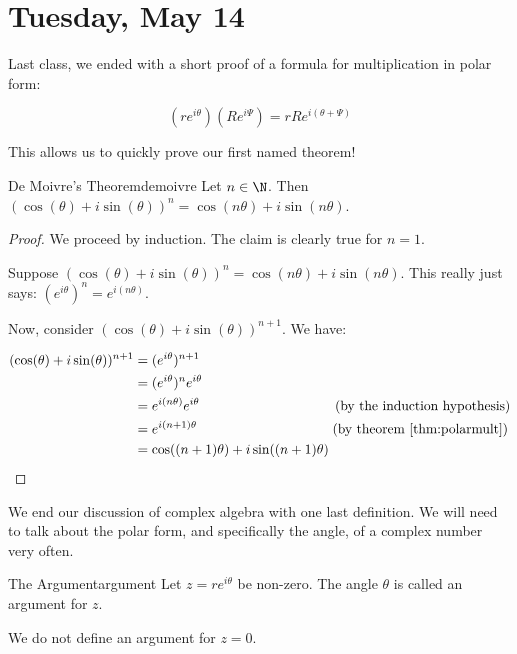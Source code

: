 \section{Tuesday, May 14}


Last class, we ended with a short proof of a formula for multiplication in polar form:

$$(re^{i\theta})(Re^{i\Psi}) = rRe^{i(\theta + \Psi)}$$

This allows us to quickly prove our first named theorem!

\begin{thmbo}{De Moivre's Theorem}{demoivre} 
Let $n\in \N$. Then $(\cos(\theta) + i\sin(\theta))^n = \cos(n\theta) + i\sin(n\theta)$.
\end{thmbo}

\begin{proof} We proceed by induction. The claim is clearly true for $n = 1$.

Suppose $(\cos(\theta) + i\sin(\theta))^n = \cos(n\theta) + i\sin(n\theta)$. This really just says: $(e^{i\theta})^n = e^{i(n\theta)}$.

Now, consider $(\cos(\theta) + i\sin(\theta))^{n+1}$. We have:

\begin{align*} (\cos(\theta) + i\sin(\theta))^{n+1} &= (e^{i\theta})^{n+1}\\
&= (e^{i\theta})^ne^{i\theta}\\
&= e^{i(n\theta)}e^{i\theta} \qquad\qquad\qquad\qquad \qquad   (\text{by the induction hypothesis})\\
&= e^{i(n+1)\theta} \qquad \qquad\qquad \qquad\qquad 	 	 (\text{by theorem \ref{thm:polarmult}})\\
&= \cos((n+1)\theta) + i\sin((n+1)\theta)
\end{align*}
\end{proof}


We end our discussion of complex algebra with one last definition. We will need to talk about the polar form, and specifically the angle, of a complex number very often.

\begin{defbo}{The Argument}{argument} Let $z = re^{i\theta}$ be non-zero. The angle $\theta$ is called an argument for $z$.

We do not define an argument for $z = 0$.
\end{defbo}

